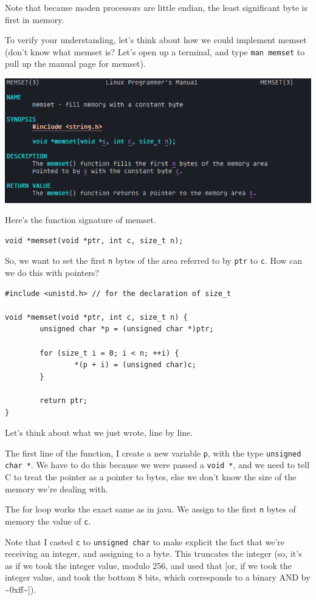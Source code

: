 \documentclass[11pt]{article}
\begin{document}
Note that because moden processors are little endian, the least
significant byte is first in memory.

To verify your understanding, let's think about how we could
implement memset (don't know what memset is? Let's open up a
terminal, and type \texttt{man memset} to pull up the manual page for
memset).

\begin{center}
\includegraphics[width=.9\linewidth]{./imgs/memset.png}
\end{center}

Here's the function signature of memset.
\begin{verbatim}
void *memset(void *ptr, int c, size_t n);
\end{verbatim}
So, we want to set the first \texttt{n} bytes of the area referred to by
\texttt{ptr} to \texttt{c}. How can we do this with pointers?
\begin{verbatim}
#include <unistd.h> // for the declaration of size_t

void *memset(void *ptr, int c, size_t n) {
        unsigned char *p = (unsigned char *)ptr;

        for (size_t i = 0; i < n; ++i) {
                *(p + i) = (unsigned char)c;
        }

        return ptr;
}
\end{verbatim}
Let's think about what we just wrote, line by line.

The first line of the function, I create a new variable \texttt{p}, with
the type \texttt{unsigned char *}. We have to do this because we were
passed a \texttt{void *}, and we need to tell C to treat the pointer as a
pointer to bytes, else we don't know the size of the memory we're
dealing with.

The for loop works the exact same as in java. We assign to the
first \texttt{n} bytes of memory the value of \texttt{c}.

Note that I casted \texttt{c} to \texttt{unsigned char} to make explicit the
fact that we're receiving an integer, and assigning to a
byte. This truncates the integer (so, it's as if we took the
integer value, modulo 256, and used that [or, if we took the
integer value, and took the bottom 8 bits, which corresponds to a
binary AND by \textasciitilde{}0xff\textasciitilde{}]).
\end{document}
